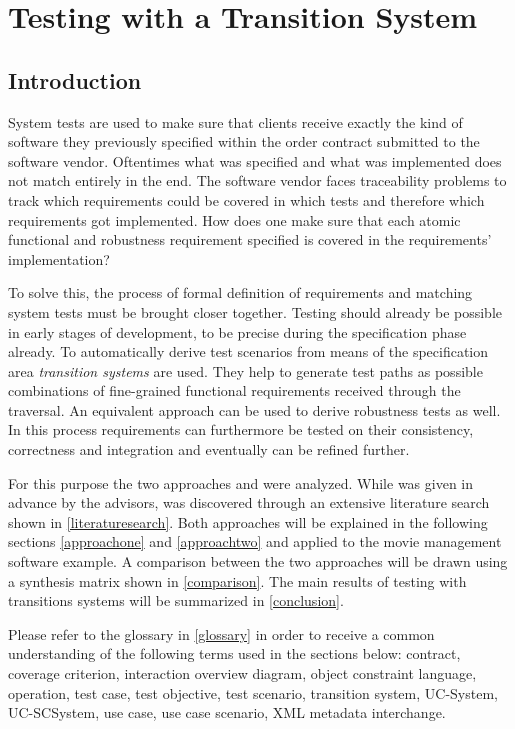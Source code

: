 \chapter{Testing with a Transition System}

\section{Introduction}

System tests are used to make sure that clients receive exactly the kind of software they previously specified within the order contract submitted to the software vendor. Oftentimes what was specified and what was implemented does not match entirely in the end. The software vendor faces traceability problems to track which requirements could be covered in which tests and therefore which requirements got implemented. How does one make sure that each atomic functional and robustness requirement specified is covered in the requirements' implementation?

To solve this, the process of formal definition of requirements and matching system tests must be brought closer together. Testing should already be possible in early stages of development, to be precise during the specification phase already. To automatically derive test scenarios from means of the specification area \textit{transition systems} are used. They help to generate test paths as possible combinations of fine-grained functional requirements received through the traversal. An equivalent approach can be used to derive robustness tests as well. In this process requirements can furthermore be tested on their consistency, correctness and integration and eventually can be refined further.

For this purpose the two approaches \cite{ClementineNebut2006} and \cite{NajlaRaza2007} were analyzed. While \cite{ClementineNebut2006} was given in advance by the advisors, \cite{NajlaRaza2007} was discovered through an extensive literature search shown in \autoref{literaturesearch}. Both approaches will be explained in the following sections \ref{approachone} and \ref{approachtwo} and applied to the movie management software example. A comparison between the two approaches will be drawn using a synthesis matrix shown in \autoref{comparison}. The main results of testing with transitions systems will be summarized in \autoref{conclusion}. 

Please refer to the glossary in \autoref{glossary} in order to receive a common understanding of the following terms used in the sections below: contract, coverage criterion, interaction overview diagram, object constraint language, operation, test case, test objective, test scenario, transition system, UC-System, UC-SCSystem, use case, use case scenario, XML metadata interchange.

